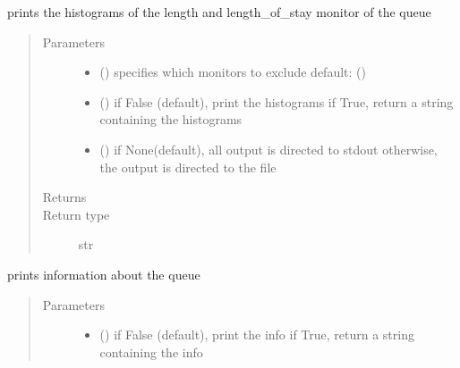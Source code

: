 \documentclass[letterpaper,10pt,english]{sphinxmanual}
\begin{document}
\begin{fulllineitems}
\begin{fulllineitems}
\end{fulllineitems}


\begin{fulllineitems}
\label{\detokenize{Reference:salabim.Queue.print_histograms}}
prints the histograms of the length and length\_of\_stay monitor of the queue
\begin{quote}\begin{description}
\item[{Parameters}] \leavevmode\begin{itemize}
\item {} 
 () \textendash{} specifies which monitors to exclude 
default: () 

\item {} 
 () \textendash{} if False (default), print the histograms
if True, return a string containing the histograms

\item {} 
 () \textendash{} if None(default), all output is directed to stdout 
otherwise, the output is directed to the file

\end{itemize}

\item[{Returns}] \leavevmode
{}

\item[{Return type}] \leavevmode
str

\end{description}\end{quote}

\end{fulllineitems}


\begin{fulllineitems}
\label{\detokenize{Reference:salabim.Queue.print_info}}
prints information about the queue
\begin{quote}\begin{description}
\item[{Parameters}] \leavevmode\begin{itemize}
\item {} 
 () \textendash{} if False (default), print the info
if True, return a string containing the info


\end{itemize}
\end{description}
\end{quote}
\end{fulllineitems}
\end{fulllineitems}
\end{document}
